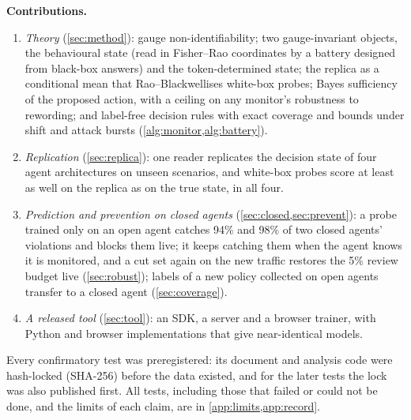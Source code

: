 \documentclass{article}
\theoremstyle{plain}
\theoremstyle{definition}
\begin{document}
\textbf{Contributions.}
\begin{enumerate}
\item \emph{Theory} (\cref{sec:method}): gauge non-identifiability; two gauge-invariant objects, the behavioural state (read in Fisher--Rao coordinates by a battery designed from black-box answers) and the token-determined state; the replica as a conditional mean that Rao--Blackwellises white-box probes; Bayes sufficiency of the proposed action, with a ceiling on any monitor's robustness to rewording; and label-free decision rules with exact coverage and bounds under shift and attack bursts (\cref{alg:monitor,alg:battery}).
\item \emph{Replication} (\cref{sec:replica}): one reader replicates the decision state of four agent architectures on unseen scenarios, and white-box probes score at least as well on the replica as on the true state, in all four.
\item \emph{Prediction and prevention on closed agents} (\cref{sec:closed,sec:prevent}): a probe trained only on an open agent catches 94\% and 98\% of two closed agents' violations and blocks them live; it keeps catching them when the agent knows it is monitored, and a cut set again on the new traffic restores the 5\% review budget live (\cref{sec:robust}); labels of a new policy collected on open agents transfer to a closed agent (\cref{sec:coverage}).
\item \emph{A released tool} (\cref{sec:tool}): an SDK, a server and a browser trainer, with Python and browser implementations that give near-identical models.
\end{enumerate}
Every confirmatory test was preregistered: its document and analysis code were hash-locked (SHA-256) before the data existed, and for the later tests the lock was also published first. All tests, including those that failed or could not be done, and the limits of each claim, are in \cref{app:limits,app:record}.



\end{document}

